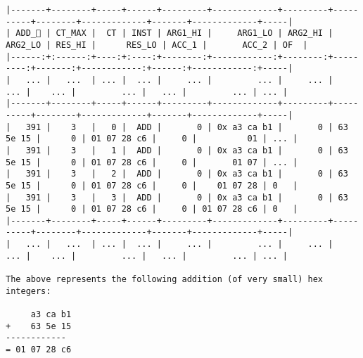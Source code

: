 \documentclass[varwidth=\maxdimen,margin=0.5cm,multi={verbatim}]{standalone}
\begin{document}
\begin{verbatim}
|-------+--------+-----+------+---------+-------------+---------+----------+--------+-------------+-------+-------------+-----|
| ADD_ | CT_MAX |  CT | INST | ARG1_HI |     ARG1_LO | ARG2_HI |  ARG2_LO | RES_HI |      RES_LO | ACC_1 |       ACC_2 | OF  |
|------:+:------:+----:+:----:+--------:+------------:+--------:+---------:+-------:+------------:+------:+------------:+-----|
|   ... |   ...  | ... |  ... |     ... |         ... |     ... |      ... |    ... |         ... |   ... |         ... | ... |
|-------+--------+-----+------+---------+-------------+---------+----------+--------+-------------+-------+-------------+-----|
|   391 |    3   |   0 |  ADD |       0 | 0x a3 ca b1 |       0 | 63 5e 15 |      0 | 01 07 28 c6 |     0 |          01 | ... |
|   391 |    3   |   1 |  ADD |       0 | 0x a3 ca b1 |       0 | 63 5e 15 |      0 | 01 07 28 c6 |     0 |       01 07 | ... |
|   391 |    3   |   2 |  ADD |       0 | 0x a3 ca b1 |       0 | 63 5e 15 |      0 | 01 07 28 c6 |     0 |    01 07 28 | 0   |
|   391 |    3   |   3 |  ADD |       0 | 0x a3 ca b1 |       0 | 63 5e 15 |      0 | 01 07 28 c6 |     0 | 01 07 28 c6 | 0   |
|-------+--------+-----+------+---------+-------------+---------+----------+--------+-------------+-------+-------------+-----|
|   ... |   ...  | ... |  ... |     ... |         ... |     ... |      ... |    ... |         ... |   ... |         ... | ... |

The above represents the following addition (of very small) hex integers:

     a3 ca b1
+    63 5e 15
------------
= 01 07 28 c6
\end{verbatim}
\end{document}
